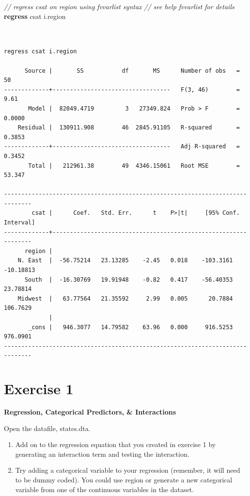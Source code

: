 \documentclass[]{book}
\newenvironment{Shaded}{\begin{snugshade}}{\end{snugshade}}
\newcommand{\CommentTok}[1]{\textcolor[rgb]{0.56,0.35,0.01}{\textit{#1}}}
\newcommand{\KeywordTok}[1]{\textcolor[rgb]{0.13,0.29,0.53}{\textbf{#1}}}
\newcommand{\NormalTok}[1]{#1}
\providecommand{\tightlist}{%
  \setlength{\itemsep}{0pt}\setlength{\parskip}{0pt}}
\begin{document}
\begin{Shaded}
\begin{Highlighting}[]
  \CommentTok{// regress csat on region using fvvarlist syntax}
  \CommentTok{// see help fvvarlist for details}
  \KeywordTok{regress}\NormalTok{ csat i.region}
\end{Highlighting}
\end{Shaded}

\begin{verbatim}


regress csat i.region

      Source |       SS           df       MS      Number of obs   =        50
-------------+----------------------------------   F(3, 46)        =      9.61
       Model |  82049.4719         3   27349.824   Prob > F        =    0.0000
    Residual |  130911.908        46  2845.91105   R-squared       =    0.3853
-------------+----------------------------------   Adj R-squared   =    0.3452
       Total |   212961.38        49  4346.15061   Root MSE        =    53.347

------------------------------------------------------------------------------
        csat |      Coef.   Std. Err.      t    P>|t|     [95% Conf. Interval]
-------------+----------------------------------------------------------------
      region |
    N. East  |  -56.75214   23.13285    -2.45   0.018    -103.3161   -10.18813
      South  |  -16.30769   19.91948    -0.82   0.417    -56.40353    23.78814
    Midwest  |   63.77564   21.35592     2.99   0.005      20.7884    106.7629
             |
       _cons |   946.3077   14.79582    63.96   0.000     916.5253    976.0901
------------------------------------------------------------------------------
\end{verbatim}

\hypertarget{exercise-1-8}{%
\section{Exercise 1}\label{exercise-1-8}}

\textbf{Regression, Categorical Predictors, \& Interactions}

Open the datafile, states.dta.

\begin{enumerate}
\def\labelenumi{\arabic{enumi}.}
\tightlist
\item
  Add on to the regression equation that you created in exercise 1 by generating an interaction term and testing the interaction.
\item
  Try adding a categorical variable to your regression (remember, it will need to be dummy coded). You could use region or generate a new categorical variable from one of the continuous variables in the dataset.
\end{enumerate}
\end{document}
